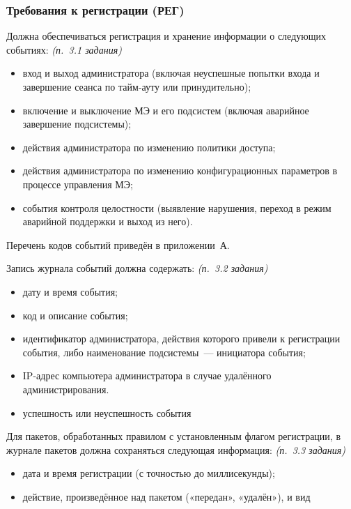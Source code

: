 \documentclass[12pt,a4paper,final]{article}
\newenvironment{reqs}
  {\begin{description}[style=sameline,leftmargin=2.2cm,labelwidth=2.0cm,
     labelsep=0.2cm,font=\normalfont\bfseries,itemsep=3pt]}
  {\end{description}}
\newcommand{\src}[1]{\textit{(п.~#1 задания)}}
\begin{document}
\subsubsection{Требования к регистрации (РЕГ)}\label{sec:reg}

\begin{reqs}
\item[РЕГ-01] Должна обеспечиваться регистрация и хранение информации о следующих
  событиях: \src{3.1}
  \begin{itemize}
  \item вход и выход администратора (включая неуспешные попытки входа
    и завершение сеанса по тайм-ауту или принудительно);
  \item включение и выключение МЭ и его подсистем (включая аварийное
    завершение подсистемы);
  \item действия администратора по изменению политики доступа;
  \item действия администратора по изменению конфигурационных параметров
    в процессе управления МЭ;
  \item события контроля целостности (выявление нарушения, переход в режим
    аварийной поддержки и выход из него).
  \end{itemize}
  Перечень кодов событий приведён в приложении~А.
\item[РЕГ-02] Запись журнала событий должна содержать: \src{3.2}
  \begin{itemize}
  \item дату и время события;
  \item код и описание события;
  \item идентификатор администратора, действия которого привели к регистрации
    события, либо наименование подсистемы~— инициатора события;
  \item IP-адрес компьютера администратора в случае удалённого администрирования.
  \item успешность или неуспешность события
  \end{itemize}
\item[РЕГ-03] Для пакетов, обработанных правилом с установленным флагом регистрации,
  в журнале пакетов должна сохраняться следующая информация: \src{3.3}
  \begin{itemize}
  \item дата и время регистрации (с точностью до миллисекунды);
  \item действие, произведённое над пакетом («передан», «удалён»), и вид

\end{itemize}
\end{reqs}
\end{document}
